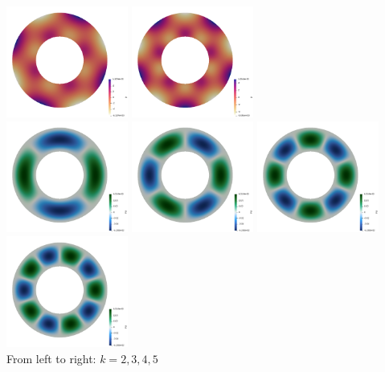 \begin{center}
\includegraphics[width=4cm]{python_codes/fieldstone_35/results/p_k4}
\includegraphics[width=4cm]{python_codes/fieldstone_35/results/p_k5}\\
\includegraphics[width=4cm]{python_codes/fieldstone_35/results/psi_k2}
\includegraphics[width=4cm]{python_codes/fieldstone_35/results/psi_k3}
\includegraphics[width=4cm]{python_codes/fieldstone_35/results/psi_k4}
\includegraphics[width=4cm]{python_codes/fieldstone_35/results/psi_k5}\\
{\captionfont From left to right: $k=2,3,4,5$}
\end{center}



